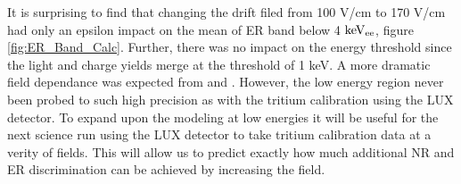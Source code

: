 It is surprising to find that changing the drift filed from 100 V/cm to 170 V/cm had only an epsilon impact on the mean of ER band below 4 $\rm keV_{ee}$, figure \ref{fig:ER_Band_Calc}. Further, there was no impact on the energy threshold since the light and charge yields merge at the threshold of 1 keV. A more dramatic field dependance was expected from \cite{Dahl_Thesis} and \cite{NEST_2013}. However, the low energy region never been probed to such high precision as with the tritium calibration using the LUX detector. To expand upon the modeling at low energies it will be useful for the next science run using the LUX detector to take tritium calibration data at a verity of fields. This will allow us to predict exactly how much additional NR and ER discrimination can be achieved by increasing the field. %
